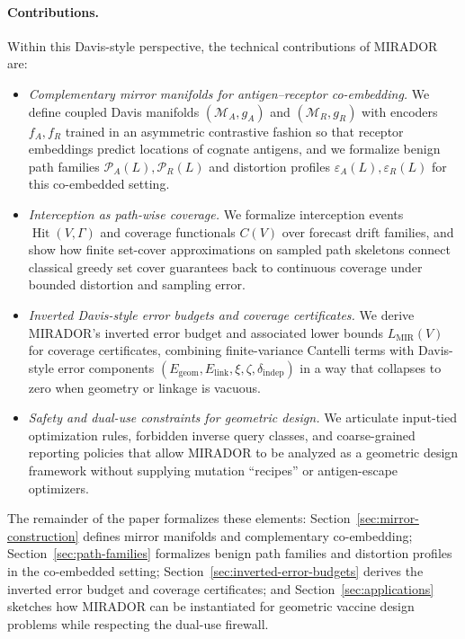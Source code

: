 \documentclass[11pt]{article}
\newcommand{\M}{\mathcal{M}}
\newcommand{\Pcal}{\mathcal{P}}
\newcommand{\Hit}{\operatorname{Hit}}
\begin{document}
\paragraph{Contributions.}
Within this Davis-style perspective, the technical contributions of MIRADOR are:
\begin{itemize}
  \item \emph{Complementary mirror manifolds for antigen--receptor co-embedding.}
  We define coupled Davis manifolds $(\M_A, g_A)$ and $(\M_R, g_R)$ with encoders
  $f_A, f_R$ trained in an asymmetric contrastive fashion so that receptor embeddings predict
  locations of cognate antigens, and we formalize benign path families $\Pcal_A(L), \Pcal_R(L)$
  and distortion profiles $\varepsilon_A(L), \varepsilon_R(L)$ for this co-embedded setting.

  \item \emph{Interception as path-wise coverage.}
  We formalize interception events $\Hit(V,\Gamma)$ and coverage functionals $C(V)$ over
  forecast drift families, and show how finite set-cover approximations on sampled path
  skeletons connect classical greedy set cover guarantees back to continuous coverage
  under bounded distortion and sampling error.

  \item \emph{Inverted Davis-style error budgets and coverage certificates.}
  We derive MIRADOR's inverted error budget and associated lower bounds
  $L_{\text{MIR}}(V)$ for coverage certificates, combining finite-variance Cantelli terms with
  Davis-style error components $(E_{\text{geom}}, E_{\text{link}}, \xi, \zeta, \delta_{\text{indep}})$ in a way
  that collapses to zero when geometry or linkage is vacuous.

  \item \emph{Safety and dual-use constraints for geometric design.}
  We articulate input-tied optimization rules, forbidden inverse query classes, and coarse-grained
  reporting policies that allow MIRADOR to be analyzed as a geometric design framework
  without supplying mutation ``recipes'' or antigen-escape optimizers.
\end{itemize}

The remainder of the paper formalizes these elements: Section~\ref{sec:mirror-construction}
defines mirror manifolds and complementary co-embedding; Section~\ref{sec:path-families} formalizes
benign path families and distortion profiles in the co-embedded setting; Section~\ref{sec:inverted-error-budgets}
derives the inverted error budget and coverage certificates; and
Section~\ref{sec:applications} sketches how MIRADOR can be instantiated for geometric vaccine
design problems while respecting the dual-use firewall.
\end{document}
